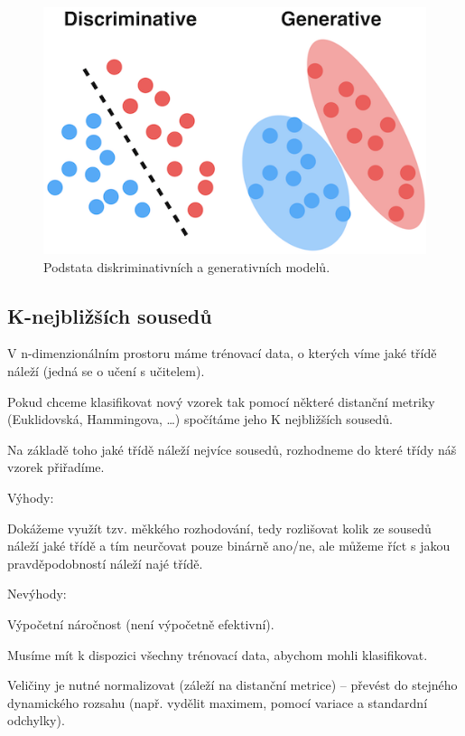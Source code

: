 \begin{figure}[H]
    \centering
    \includegraphics[width=0.5\linewidth]{generative_discriminative.png}
    \caption{Podstata diskriminativních a generativních modelů.}
\end{figure}

\subsection{K-nejbližších sousedů}

\begin{compactitem}
    \item V n-dimenzionálním prostoru máme trénovací data, o kterých víme jaké třídě náleží (jedná se o učení s učitelem).

    \item Pokud chceme klasifikovat nový vzorek tak pomocí některé distanční metriky (Euklidovská, Hammingova, \dots) spočítáme jeho K nejbližších sousedů.

    \item Na základě toho jaké třídě náleží nejvíce sousedů, rozhodneme do které třídy náš vzorek přiřadíme.

    \item Výhody: \begin{compactitem}
        \item Dokážeme využít tzv. měkkého rozhodování, tedy rozlišovat kolik ze sousedů náleží jaké třídě a tím neurčovat pouze binárně ano/ne, ale můžeme říct s jakou pravděpodobností náleží najé třídě.

    \end{compactitem}
    \item Nevýhody: \begin{compactitem}
        \item Výpočetní náročnost (není výpočetně efektivní).
        \item Musíme mít k dispozici všechny trénovací data, abychom mohli klasifikovat.
        \item Veličiny je nutné normalizovat (záleží na distanční metrice) -- převést do stejného dynamického rozsahu (např. vydělit maximem, pomocí variace a standardní odchylky).
    \end{compactitem}
\end{compactitem}

